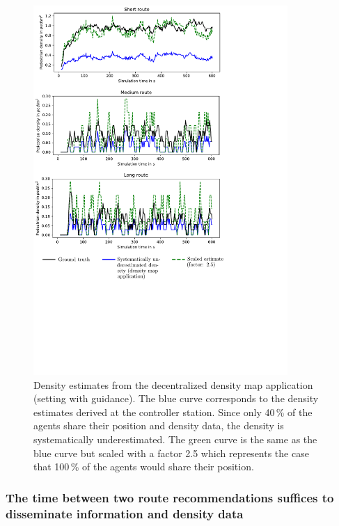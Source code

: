 \begin{figure}[H]
\centering
\includegraphics[width=0.86\textwidth,trim={0cm 6cm 4cm 0cm},clip]{../figures/investigation/RealisticScenario/densityestimates/densityestimates2.pdf} 
\caption[Density estimates from the decentralized density map application]{Density estimates from the decentralized density map application (setting with guidance).  The blue curve corresponds to the density estimates derived at the controller station. Since only 40\,\% of the agents share their position and density data, the density is systematically underestimated. The green curve is the same as the blue curve but scaled with a factor 2.5 which represents the case that 100\,\% of the agents would share their position. }
\label{fig:densityerrordef}
\end{figure}

\newpage


\subsubsection{The time between two route recommendations suffices to disseminate information and density data}


